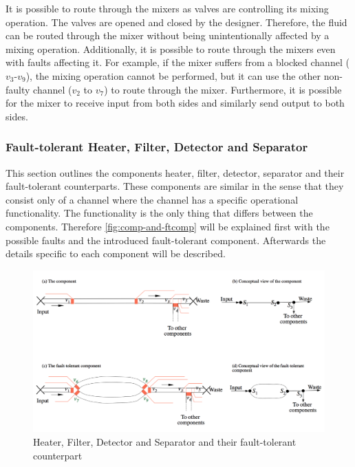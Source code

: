 It is possible to route through the mixers as valves are controlling its mixing operation. The valves are opened and closed by the designer. Therefore, the fluid can be routed through the mixer without being unintentionally affected by a mixing operation. Additionally, it is possible to route through the mixers even with faults affecting it. For example, if the mixer suffers from a blocked channel ($v_3$-$v_9$), the mixing operation cannot be performed, but it can use the other non-faulty channel ($v_2$ to $v_7$) to route through the mixer. Furthermore, it is possible for the mixer to receive input from both sides and similarly send output to both sides.


\subsubsection{Fault-tolerant Heater, Filter, Detector and Separator}
This section outlines the components heater, filter, detector, separator and their fault-tolerant counterparts. These components are similar in the sense that they consist only of a channel where the channel has a specific operational functionality. The functionality is the only thing that differs between the components. Therefore \autoref{fig:comp-and-ftcomp} will be explained first with the possible faults and the introduced fault-tolerant component. Afterwards the details specific to each component will be described.

\begin{figure}
\centering
\includegraphics[scale=0.35]{figures/component-and-ftcomponent.png}
\caption[Heater, Filter, Detector and Separator and their fault-tolerant counterpart]{Heater, Filter, Detector and Separator and their fault-tolerant counterpart}
\label{fig:comp-and-ftcomp}
\end{figure}

